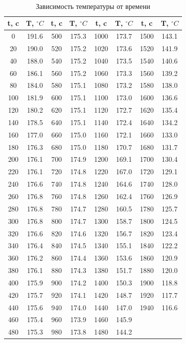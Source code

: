 \documentclass{article}
\begin{document}
\setlength\doublerulesep{0.7pt}
\begin{table}[htb]
	\hypertarget{table}{}\\
	\caption{Зависимость температуры от времени}
	\begin{tabular}{c|c||c|c||c|c||c|c}
		t, c& T, $ ^\circ C $&t, c& T, $ ^\circ C $&t, c& T, $ ^\circ C $&t, c& T, $ ^\circ C $\\
		\hline\hline
		\cellcolor{yellow}0 & \cellcolor{yellow}191.6	&	500	&	175.3	&	1000	&	173.7	&	1500	&	143.1	\\
		20	&	190.0	&	520	&	175.2	&	1020	&	173.6	&	1520	&	141.9	\\
		40	&	188.0	&	540	&	175.2	&	1040	&	173.5	&	1540	&	140.6	\\
		60	&	186.1	&	560	&	175.2	&	1060	&	173.3	&	1560	&	139.2	\\
		80	&	184.0	&	580	&	175.1	&	1080	&	173.2	&	1580	&	138.0	\\
		100	&	181.9	&	600	&	175.1	&	1100	&	173.0	&	1600	&	136.6	\\
		120	&	180.2	&	620	&	175.1	&	1120	&	172.7	&	1620	&	135.4	\\
		140	&	178.5	&	640	&	175.1	&	1140	&	172.4	&	1640	&	134.2	\\
		160	&	177.0	&	660	&	175.0	&	\cellcolor{yellow}1160&	\cellcolor{yellow}172.1	&	1660	&	133.0	\\
		180	&	176.3	&	680	&	175.0	&	1180	&	170.7	&	1680	&	131.7	\\
		\cellcolor{yellow}200&	\cellcolor{yellow}176.1	&	700	&	174.9	&	1200	&	169.1	&	1700	&	130.4	\\
		220	&	176.1	&	720	&	174.8	&	1220	&	167.0	&	1720	&	129.1	\\
		240	&	176.6	&	740	&	174.8	&	1240	&	164.6	&	1740	&	128.0	\\
		260	&	176.8	&	760	&	174.8	&	1260	&	162.4	&	1760	&	126.9	\\
		280	&	176.8	&	780	&	174.7	&	1280	&	160.5	&	1780	&	125.7	\\
		300	&	176.8	&	800	&	174.7	&	1300	&	158.7	&	1800	&	124.5	\\
		320	&	176.6	&	820	&	174.6	&	1320	&	156.7	&	1820	&	123.4	\\
		340	&	176.4	&	840	&	174.5	&	1340	&	155.1	&	1840	&	122.2	\\
		360	&	176.2	&	860	&	174.4	&	1360	&	153.6	&	1860	&	120.9	\\
		380	&	176.1	&	880	&	174.3	&	1380	&	151.7	&	1880	&	120.0	\\
		400	&	175.9	&	900	&	174.2	&	1400	&	150.3	&	1900	&	118.8	\\
		420	&	175.7	&	920	&	174.1	&	1420	&	148.7	&	1920	&	117.7	\\
		440	&	175.6	&	940	&	174.0	&	1440	&	147.0	&	\cellcolor{yellow}1940	&	\cellcolor{yellow}116.6	\\
		460	&	175.4	&	960	&	173.9	&	1460	&	145.9	&		&		\\
		480	&	175.3	&	980	&	173.8	&	1480	&	144.2	&		&		
	\end{tabular}
\end{table}
\end{document}
